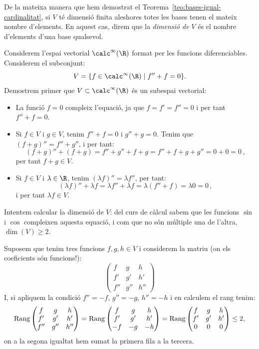 De la mateixa manera que hem demostrat el Teorema~\ref{teo:bases-igual-cardinalitat}, si $V$ té dimensió finita aleshores totes les bases tenen el mateix nombre d'elements.  En aquest cas, direm que la \emph{dimensió de $V$} és el nombre d'elements d'una base qualsevol.
\begin{exemple}\label{exempl:sincos}
Considerem l'espai vectorial $\calc^\infty(\R)$ format per les funcions diferenciables. Considerem el subconjunt:
$$
V=\{ f \in \calc^\infty(\R) \mid f''+f=0\}.
$$
Demostrem primer que $V\subset\calc^\infty(\R)$ és un subespai vectorial:
\begin{itemize}
    \item La funció $f=0$ compleix l'equació, ja que $f=f'=f''=0$ i per tant $f''+f=0$.
    \item Si $f\in V$ i $g\in V$, tenim $f''+f=0$ i $g''+g=0$. Tenim que $(f+g)''=f''+g''$, i per tant:
    $$
    (f+g)''+(f+g)=f''+g''+f+g=f''+f+g+g''=0+0=0\,,
    $$
    per tant $f+g\in V$.
    \item Si $f\in V$ i $\lambda\in\R$, tenim $(\lambda f)''=\lambda f''$, per tant:
    $$
    (\lambda f)''+\lambda f=\lambda f''+\lambda f=\lambda(f''+f)=\lambda 0=0 \, ,
    $$
    i per tant $\lambda f \in V$.
\end{itemize}
Intentem calcular la dimensió de $V$: del curs de càlcul sabem que les funcions $\sin$ i $\cos$ compleixen aquesta equació, i com que no són múltiple una de l'altra, $\dim(V)\geq 2$.

Suposem que tenim tres funcions $f,g,h\in V$ i considerem la matriu (on els coeficients són funcions!):
$$
\begin{pmatrix}
f & g & h\\ f' & g' & h' \\ f'' & g'' & h''
\end{pmatrix}
$$
I, si apliquem la condició $f''=-f$, $g''=-g$, $h''=-h$ i en calculem el rang tenim:
$$
\operatorname{Rang}\begin{pmatrix}
f & g & h\\ f' & g' & h' \\ f'' & g'' & h''
\end{pmatrix} =
\operatorname{Rang}\begin{pmatrix}
f & g & h\\ f' & g' & h' \\ -f & -g & -h
\end{pmatrix}=
\operatorname{Rang}\begin{pmatrix}
f & g & h\\ f' & g' & h' \\ 0 & 0 & 0
\end{pmatrix}\leq 2,
$$
on a la segona igualtat hem sumat la primera fila a la tercera.


\end{exemple}
